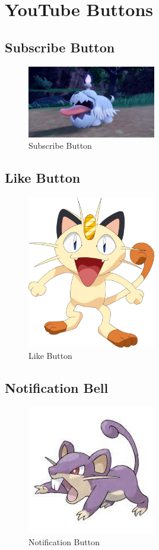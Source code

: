 \chapter{YouTube Buttons}
\section{Subscribe Button}
\begin{figure}[H]
    \centering
    \includegraphics[width=0.5\textwidth]{images/perro.jpg}
    \caption{Subscribe Button}
    \label{fig:Subscribe}
\end{figure}
\section{Like Button}
\begin{figure}[H]
    \centering
    \includegraphics[width=0.5\textwidth]{images/gato.png}
    \caption{Like Button}
    \label{fig:Like}
\end{figure}
\section{Notification Bell}
\begin{figure}[H]
    \centering
    \includegraphics[width=0.5\textwidth]{images/raton.jpg}
    \caption{Notification Button}
    \label{fig:Notification}
\end{figure}